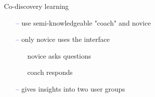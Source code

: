 \documentclass[pdf]{beamer}
\begin{document}
{{\begin{frame}
    Co-discovery learning
    \begin{itemize}
      \item[\textcolor{Blue}{--}] use semi-knowledgeable "coach" and novice
      \item[\textcolor{Blue}{--}] only novice uses the interface
      \begin{itemize}
      	\item[{\textbullet}] novice asks questions
      	\item[{\textbullet}] coach responds
      \end{itemize}
      \item[\textcolor{Blue}{--}] gives insights into two user groups
    \end{itemize}
\end{frame}}



}
\end{document}
